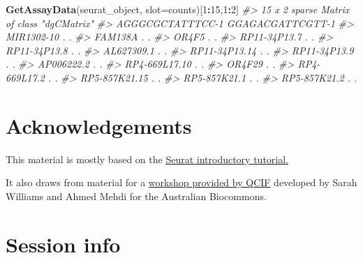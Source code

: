 \documentclass[
]{book}
\newenvironment{Shaded}{\begin{snugshade}}{\end{snugshade}}
\newcommand{\AttributeTok}[1]{\textcolor[rgb]{0.13,0.29,0.53}{#1}}
\newcommand{\CommentTok}[1]{\textcolor[rgb]{0.56,0.35,0.01}{\textit{#1}}}
\newcommand{\DecValTok}[1]{\textcolor[rgb]{0.00,0.00,0.81}{#1}}
\newcommand{\FunctionTok}[1]{\textcolor[rgb]{0.13,0.29,0.53}{\textbf{#1}}}
\newcommand{\NormalTok}[1]{#1}
\newcommand{\SpecialCharTok}[1]{\textcolor[rgb]{0.81,0.36,0.00}{\textbf{#1}}}
\newcommand{\StringTok}[1]{\textcolor[rgb]{0.31,0.60,0.02}{#1}}
\begin{document}
\begin{Shaded}
\begin{Highlighting}[]
\FunctionTok{GetAssayData}\NormalTok{(seurat\_object, }\AttributeTok{slot=}\StringTok{\textquotesingle{}counts\textquotesingle{}}\NormalTok{)[}\DecValTok{1}\SpecialCharTok{:}\DecValTok{15}\NormalTok{,}\DecValTok{1}\SpecialCharTok{:}\DecValTok{2}\NormalTok{]}
\CommentTok{\#\textgreater{} 15 x 2 sparse Matrix of class "dgCMatrix"}
\CommentTok{\#\textgreater{}               AGGGCGCTATTTCC{-}1 GGAGACGATTCGTT{-}1}
\CommentTok{\#\textgreater{} MIR1302{-}10                   .                .}
\CommentTok{\#\textgreater{} FAM138A                      .                .}
\CommentTok{\#\textgreater{} OR4F5                        .                .}
\CommentTok{\#\textgreater{} RP11{-}34P13.7                 .                .}
\CommentTok{\#\textgreater{} RP11{-}34P13.8                 .                .}
\CommentTok{\#\textgreater{} AL627309.1                   .                .}
\CommentTok{\#\textgreater{} RP11{-}34P13.14                .                .}
\CommentTok{\#\textgreater{} RP11{-}34P13.9                 .                .}
\CommentTok{\#\textgreater{} AP006222.2                   .                .}
\CommentTok{\#\textgreater{} RP4{-}669L17.10                .                .}
\CommentTok{\#\textgreater{} OR4F29                       .                .}
\CommentTok{\#\textgreater{} RP4{-}669L17.2                 .                .}
\CommentTok{\#\textgreater{} RP5{-}857K21.15                .                .}
\CommentTok{\#\textgreater{} RP5{-}857K21.1                 .                .}
\CommentTok{\#\textgreater{} RP5{-}857K21.2                 .                .}
\end{Highlighting}
\end{Shaded}

\chapter{Acknowledgements}\label{acknowledgements}

This material is mostly based on the \href{https://satijalab.org/seurat/articles/pbmc3k_tutorial.html}{Seurat introductory tutorial.}

It also draws from material for a \href{https://swbioinf.github.io/scRNAseqInR_Doco/index.html}{workshop provided by QCIF} developed by Sarah Williams and Ahmed Mehdi for the Australian Biocommons.

\chapter{Session info}\label{session-info}
\end{document}
